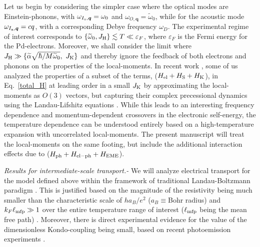 \documentclass[aps,prl,twocolumn,superscriptaddress,amsmath,nofootinbib,10pt,floatfix]{revtex4-2}
\def \ve {\varepsilon}
\def \ve {\varepsilon}
\def \tn {\textnormal}
\def \tn {\textnormal}
\begin{document}
Let us begin by considering the simpler case where the optical modes are Einstein-phonons, with ${\omega}_{I_{\rm o},\boldsymbol{q}} = \omega_0$ and $\omega_{O,\boldsymbol{q}} = \widetilde{\omega}_0$, while for the acoustic mode ${\omega}_{I_{\rm a},\boldsymbol{q}} = cq$, with a corresponding Debye frequency $\omega_D$. The experimental %
regime of interest  corresponds to $\{\widetilde{\omega}_0,J_{\rm{H}}\}\lesssim T\ll\ve_F$, where $\ve_F$ is the Fermi energy for the Pd-electrons. Moreover, we shall consider the limit where $ J_{\rm{H}} \gg \{\widetilde{\alpha}\sqrt{\hbar/M\widetilde{\omega}_0},~J_{\rm{K}}\}$ and thereby ignore the feedback of both electrons and phonons on the properties of the local-moments. In recent work \cite{mcroberts2022intermediatescale}, some of us analyzed the properties of a subset of the terms, ($H_{\tn{el}}+H_{\tn{S}}+H_{\tn{K}}$), in Eq.~\eqref{total_H} at leading order in a small $J_{\rm{K}}$ by approximating the local-moments as $O(3)$ vectors, but capturing their complex precessional dynamics using the Landau-Lifshitz equations \cite{Keren_1994,Moessner_1998L,Moessner_1998B,conlon,Anjana_2017,Mourigal_2019,Shu_2019,Knolle_2022T}. While this leads to an interesting frequency dependence and momentum-dependent crossovers in the electronic self-energy, the temperature dependence can be understood entirely based on a high-temperature expansion with uncorrelated local-moments. The present manuscript will treat the local-moments on the same footing, but include the additional interaction effects due to ($H_{\rm{ph}}+H_{\rm{el-ph}}+H_{\rm{EME}}$).

{\it Results for intermediate-scale transport.-} We will analyze electrical transport for the model defined above within the framework of traditional Landau-Boltzmann paradigm \cite{Ziman_2001}. This is justified based on the magnitude of the resistivity being much smaller than the characteristic scale of $ha_B/e^2$ ($a_B\equiv$Bohr radius) and $k_F \ell_{\rm mfp} \gg 1$ over the entire temperature range of interest ($\ell_{\rm mfp}$ being the mean free path) \cite{Hicks2015}. Moreover, there is direct experimental evidence for the value of the dimensionless Kondo-coupling being small, based on recent photoemission experiments \cite{sunko_probing_2020}. 
\end{document}
